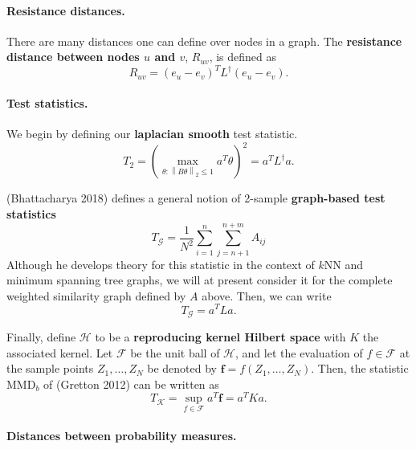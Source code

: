 \documentclass{article}
\newcommand{\norm}[1]{\left\lVert#1\right\rVert}
\newcommand{\Linv}{L^{\dagger}}
\theoremstyle{alden}
\theoremstyle{definition}
\theoremstyle{remark}
\begin{document}
\paragraph{Resistance distances.}

There are many distances one can define over nodes in a graph. The \textbf{resistance distance between nodes $u$ and $v$}, $R_{uv}$, is defined as
\begin{equation*}
R_{uv} = (e_u - e_v)^T \Linv (e_u - e_v).
\end{equation*}

\paragraph{Test statistics.}

We begin by defining our \textbf{laplacian smooth} test statistic. 
\begin{equation*}
T_2 = \left(\max_{\theta: \norm{B\theta}_2 \leq 1} a^T \theta \right)^2 = a^T \Linv a. 
\end{equation*}

(Bhattacharya 2018) defines a general notion of 2-sample \textbf{graph-based test statistics}
\begin{equation*}
T_{\mathcal{G}} = \frac{1}{N^2}\sum_{i = 1}^{n} \sum_{j = n + 1}^{n + m} A_{ij}
\end{equation*}
Although he develops theory for this statistic in the context of $k$NN and minimum spanning tree graphs, we will at present consider it for the complete weighted similarity graph defined by $A$ above. Then, we can write 
\begin{equation*}
T_{\mathcal{G}} = a^T L a.
\end{equation*}

Finally, define $\mathcal{H}$ to be a \textbf{reproducing kernel Hilbert space} with $K$ the associated kernel. Let $\mathcal{F}$ be the unit ball of $\mathcal{H}$, and let the evaluation of $f \in \mathcal{F}$ at the sample points $Z_1, \ldots, Z_N$ be denoted by $\textbf{f} = f(Z_1, \ldots, Z_N)$. Then, the statistic $\text{MMD}_b$ of (Gretton 2012) can be written as
\begin{equation*}
T_{\mathcal{K}} = \sup_{f \in \mathcal{F}} a^T \textbf{f} = a^T K a. 
\end{equation*}

\paragraph{Distances between probability measures.} 
\end{document}
